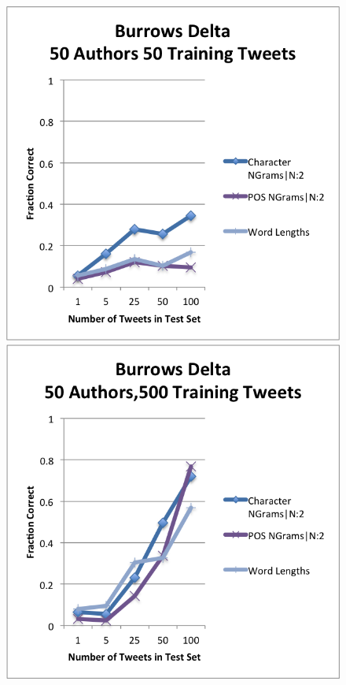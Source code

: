 \documentclass[pageno]{jpaper}
\begin{document}
\begin{figure}[h!]
\begin{center}
\includegraphics*[scale=.75]{B1}
\includegraphics*[scale=.75]{B3}

\end{center}
\end{figure}
\end{document}
